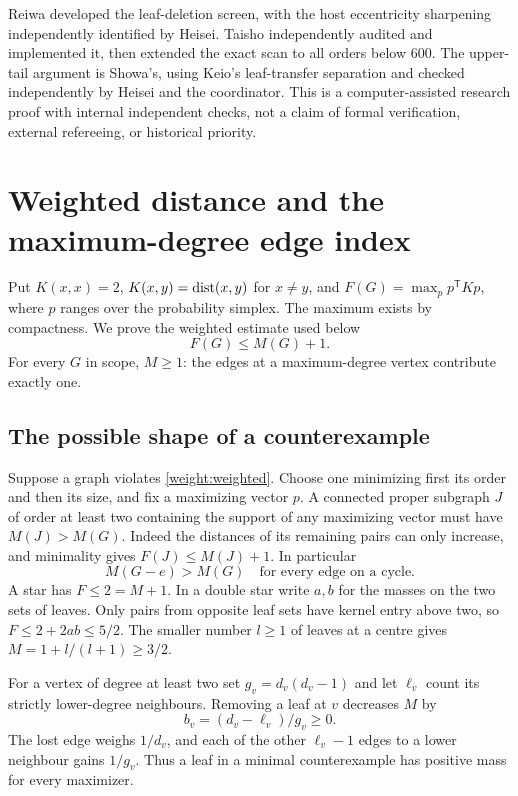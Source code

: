 Reiwa developed the leaf-deletion screen, with the host eccentricity
sharpening independently identified by Heisei. Taisho independently audited
and implemented it, then extended the exact scan to all orders below 600. The upper-tail
argument is Showa's, using Keio's leaf-transfer separation and checked
independently by Heisei and the coordinator. This is a computer-assisted
research proof with internal independent checks, not a claim of formal
verification, external refereeing, or historical priority.
\section{Weighted distance and the maximum-degree edge index}

Put $K(x,x)=2$, $K(x,y)=\operatorname{dist}(x,y)$ for $x\ne y$, and $F(G)=\max_{p}p^{\mathsf T}Kp$, where $p$ ranges over the probability simplex. The maximum exists by compactness. We prove the weighted estimate used below
\begin{equation} F(G)\le M(G)+1.\label{weight:weighted}\end{equation}
For every $G$ in scope, $M\ge1$: the edges at a maximum-degree vertex contribute exactly one.
\subsection{The possible shape of a counterexample}
Suppose a graph violates \eqref{weight:weighted}. Choose one minimizing first its order and then its size, and fix a maximizing vector $p$. A connected proper subgraph $J$ of order at least two containing the support of any maximizing vector must have $M(J)>M(G)$. Indeed the distances of its remaining pairs can only increase, and minimality gives $F(J)\le M(J)+1$. In particular
\begin{equation}
 M(G-e)>M(G)\quad\text{for every edge on a cycle.}\label{weight:supportive}
\end{equation}
A star has $F\le2=M+1$. In a double star write $a,b$ for the masses on the two sets of leaves. Only pairs from opposite leaf sets have kernel entry above two, so $F\le2+2ab\le5/2$. The smaller number $l\ge1$ of leaves at a centre gives $M=1+l/(l+1)\ge3/2$.

For a vertex of degree at least two set $g_v=d_v(d_v-1)$ and let $\ell_v$ count its strictly lower-degree neighbours. Removing a leaf at $v$ decreases $M$ by
\begin{equation}
 b_v=(d_v-\ell_v)/g_v\ge0.\label{weight:bleaf}
\end{equation}
The lost edge weighs $1/d_v$, and each of the other $\ell_v-1$ edges to a lower neighbour gains $1/g_v$. Thus a leaf in a minimal counterexample has positive mass for every maximizer.

